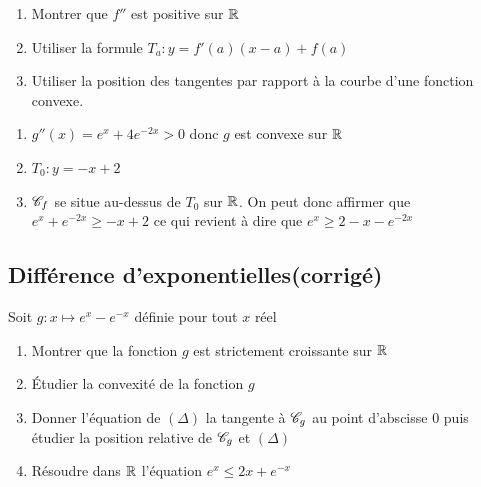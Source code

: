 \documentclass[oneside,12pt]{book}          %
\begin{document}
\begin{hint}
	\begin{enumerate}
	\item Montrer que $f''$ est positive sur ${\mathbb R}$
	\item Utiliser la formule $T_a:y=f'(a)(x-a)+f(a)$
	\item Utiliser la position des tangentes par rapport à la courbe d'une fonction convexe.
	\end{enumerate}
\end{hint}
\begin{sol}
	\begin{enumerate}
		\item $g''(x)=e^x+4e^{-2x}>0$ donc $g$ est convexe sur ${\mathbb R}$
		\item $T_0:y=-x+2$
		\item ${\mathscr{C}}_f$ se situe au-dessus de $T_0$ sur ${\mathbb R}$. On peut donc affirmer que $e^x+e^{-2x}\geq-x+2$ ce qui revient à dire que $e^x\geq2-x-e^{-2x}$
	\end{enumerate}
\end{sol}


\subsection{Différence d'exponentielles\quad\small{(corrigé)}}
Soit $g:x\mapsto e^x-e^{-x}$ définie pour tout $x$ réel
\begin{enumerate}
    \item Montrer que la fonction $g$ est strictement croissante sur ${\mathbb R}$
    \item Étudier la convexité de la fonction $g$
    \item Donner l'équation de $(\Delta)$ la tangente à ${\mathscr{C}}_g$ au point d'abscisse 0 puis étudier la position relative de ${\mathscr{C}}_g$ et $(\Delta)$
    \item Résoudre dans ${\mathbb R}$ l'équation $e^x\leq2x+e^{-x}$
\end{enumerate}
\end{document}
